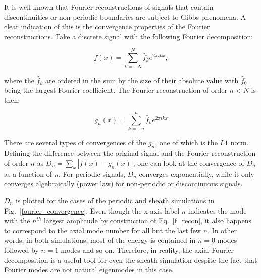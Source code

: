 \documentclass[showpacs,preprintnumbers,amsmath,amssymb,superscriptaddress,aip]{revtex4-1}
\def\beq{\begin{equation}}
\def\eeq{\end{equation}}
\begin{document}
It is well known that Fourier reconstructions of signals that contain discontinuities or non-periodic boundaries are subject to Gibbs phenomena. A clear indication of this is the
convergence properties of the Fourier reconstructions. Take a discrete signal with the following Fourier decomposition:

\beq
\label{f_decomp}
f(x) = \sum_{k=-N}^{N} \hat{f}_k e^{2 \pi i k x},
\eeq

where the $\hat{f}_k$ are ordered in the sum by the size of their absolute value with $\hat{f}_0$ being the largest Fourier coefficient. The Fourier reconstruction of order $n<N$ is then:

\beq
\label{f_recon}
g_n(x) = \sum_{k=-n}^{n} \hat{f}_k e^{2 \pi i k x}
\eeq

There are several types of convergences of the $g_n$, one of which is the $L1$ norm. Defining the difference between the original signal and the Fourier reconstruction of order $n$ as
$D_n = \sum_x |f(x) - g_n(x)|$, one can look at the convergence of $D_n$ as a function of $n$. For periodic signals, $D_n$ converges exponentially, while it only converges algebraically
(power law) for non-periodic or discontinuous signals. 

$D_n$ is plotted for the cases of the periodic and sheath simulations in Fig.~\ref{fourier_convergence}. Even though the x-axis label $n$ indicates the mode with the $n^{th}$ largest amplitude
by construction of Eq.~\ref{f_recon}, it also happens to correspond to the axial mode number for all but the last few $n$. In other words, in both simulations, most of the energy is contained
in $n=0$ modes followed by $n=1$ modes and so on. Therefore, in reality, the axial Fourier decomposition is a useful tool for even the sheath simulation despite the fact that Fourier
modes are not natural eigenmodes in this case.



%
%
\end{document}
